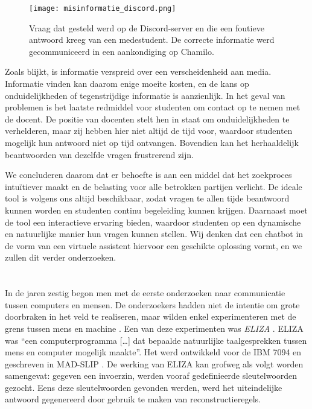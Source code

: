 \begin{figure}
  \centering
  \texttt{[image: misinformatie\_discord.png]}
  \caption[Misinformatie op Discord-server]{\label{fig:misinformatie_discord}Vraag dat gesteld werd op de Discord-server en die een foutieve antwoord kreeg van een medestudent. De correcte informatie werd gecommuniceerd in een aankondiging op Chamilo.}
\end{figure}

Zoals blijkt, is informatie verspreid over een verscheidenheid aan media. Informatie vinden kan daarom enige moeite kosten, en de kans op onduidelijkheden of tegenstrijdige informatie is aanzienlijk. In het geval van problemen is het laatste redmiddel voor studenten om contact op te nemen met de docent. De positie van docenten stelt hen in staat om onduidelijkheden te verhelderen, maar zij hebben hier niet altijd de tijd voor, waardoor studenten mogelijk hun antwoord niet op tijd ontvangen. Bovendien kan het herhaaldelijk beantwoorden van dezelfde vragen frustrerend zijn.

We concluderen daarom dat er behoefte is aan een middel dat het zoekproces intuïtiever maakt en de belasting voor alle betrokken partijen verlicht. De ideale tool is volgens ons altijd beschikbaar, zodat vragen te allen tijde beantwoord kunnen worden en studenten continu begeleiding kunnen krijgen. Daarnaast moet de tool een interactieve ervaring bieden, waardoor studenten op een dynamische en natuurlijke manier hun vragen kunnen stellen. Wij denken dat een chatbot in de vorm van een virtuele assistent hiervoor een geschikte oplossing vormt, en we zullen dit verder onderzoeken.

\section{}%
\label{sec:evolutie-chatbots}

In de jaren zestig begon men met de eerste onderzoeken naar communicatie tussen computers en mensen. De onderzoekers hadden niet de intentie om grote doorbraken in het veld te realiseren, maar wilden enkel experimenteren met de grens tussen mens en machine \autocite{Dibitonto2018, AbuShawar2007}. Een van deze experimenten was \emph{ELIZA} \autocite{Weizenbaum1966}. ELIZA was ``een computerprogramma [\ldots] dat bepaalde natuurlijke taalgesprekken tussen mens en computer mogelijk maakte''. Het werd ontwikkeld voor de IBM 7094 en geschreven in MAD-SLIP \autocite{Weizenbaum1966}. De werking van ELIZA kan grofweg als volgt worden samengevat: gegeven een invoerzin, werden vooraf gedefinieerde sleutelwoorden gezocht. Eens deze sleutelwoorden gevonden werden, werd het uiteindelijke antwoord gegenereerd door gebruik te maken van reconstructieregels.

